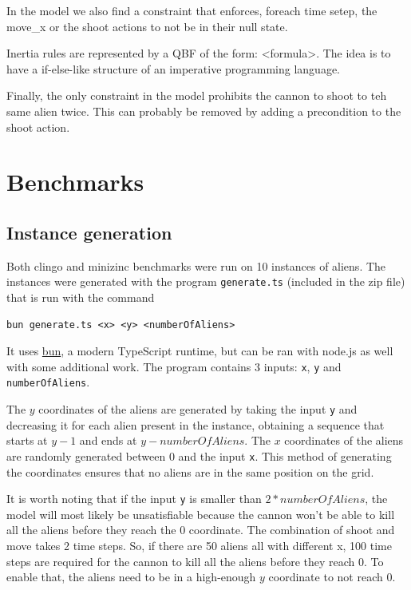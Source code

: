 \documentclass[11pt]{article}
\begin{document}
In the model we also find a constraint that enforces, foreach time setep, the move\_x or the shoot actions to not be in their null state.

Inertia rules are represented by a QBF of the form: <formula>.
The idea is to have a if-else-like structure of an imperative programming language.

Finally, the only constraint in the model prohibits the cannon to shoot to teh same alien twice.
This can probably be removed by adding a precondition to the shoot action.


\section{Benchmarks}

\subsection{Instance generation}
Both clingo and minizinc benchmarks were run on 10 instances of aliens.
The instances were generated with the program \texttt{generate.ts} (included in the zip file) that is run with the command

\begin{verbatim}
bun generate.ts <x> <y> <numberOfAliens>
\end{verbatim}

It uses \href{https://bun.sh/}{bun}, a modern TypeScript runtime, but can be ran with node.js as well with some additional work.
The program contains 3 inputs: \texttt{x}, \texttt{y} and \texttt{numberOfAliens}.

The $y$ coordinates of the aliens are generated by taking the input \texttt{y} and decreasing it for each alien present in the instance, obtaining a sequence that starts at $y - 1$ and ends at $y - numberOfAliens$.
The $x$ coordinates of the aliens are randomly generated between 0 and the input \texttt{x}.
This method of generating the coordinates ensures that no aliens are in the same position on the grid.

It is worth noting that if the input \texttt{y} is smaller than $2*numberOfAliens$, the model will most likely be unsatisfiable because the cannon won't be able to kill all the aliens before they reach the $0$ coordinate.
The combination of shoot and move takes 2 time steps.
So, if there are 50 aliens all with different x, 100 time steps are required for the cannon to kill all the aliens before they reach 0.
To enable that, the aliens need to be in a high-enough $y$ coordinate to not reach 0.
\end{document}

